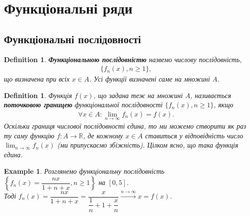 \documentclass[a4paper, 10pt]{article}
\def\huge{\displaystyle}
\theoremstyle{theoremdd}
\theoremstyle{theoremdd}
\theoremstyle{theoremdd}
\newtheorem{definition}[theorem]{Definition}
\theoremstyle{theoremdd}
\theoremstyle{theoremdd}
\newtheorem{example}[theorem]{Example}
\theoremstyle{theoremdd}
\theoremstyle{theoremdd}
\theoremstyle{theoremdd}
\theoremstyle{theoremdd}
\begin{document}
\section{Функціональні ряди}
\subsection{Функціональні послідовності}
\begin{definition}
\textbf{Функціональною послідовністю} назвемо числову послідовність,
\begin{align*}
\{f_n(x), n \geq 1 \},
\end{align*}
що визначена при всіх $x \in A$. Усі функції визначені саме на множині $A$.
\end{definition}

\begin{definition}
Функція $f(x)$, що задана теж на множині $A$, називається \textbf{поточковою границею} функціональної послідовності $\{f_n(x), n \geq 1\}$, якщо
\begin{align*}
\forall x \in A: \lim_{n \to \infty} f_n(x) = f(x).
\end{align*}
Оскільки границя числової послідовності єдина, то ми можемо створити як раз ту саму функцію $f \colon A \to \mathbb{R}$, де кожному $x \in A$ ставиться у відповідність число $\displaystyle\lim_{n \to \infty} f_n(x)$ (ми припускаємо збіжність). Цілком ясно, що така функція єдина.
\end{definition}

\iffalse
\begin{example}
Розглянемо послідовність $\{f_n(x) = x^n, n \geq 1\}$ на множині $[0,1]$. Тоді маємо:\\
$f(x) = \huge\lim_{n \to \infty} f_n(x) = \begin{cases} 0, & x \in [0,1) \\ 1, & x = 1 \end{cases}$.\\
Зауважимо, що всі функції $f_n \in C([0,1])$, проте $f \not\in C([0,1])$. Необхідно щось таке розглянути, щоб гранична функція була також неперервною.
\end{example}
\fi

\begin{example}
Розглянемо функціональну послідовність $\left\{ f_n(x) = \dfrac{nx}{1+n+x}, n \geq 1 \right\}$ на $[0,5]$.\\
Тоді $f_n(x) = \dfrac{nx}{1+n+x} = \dfrac{x}{\dfrac{1}{n}+ 1 + \dfrac{x}{n}} \overset{n \to \infty}{\longrightarrow} x = f(x)$.
\end{example}
\end{document}
